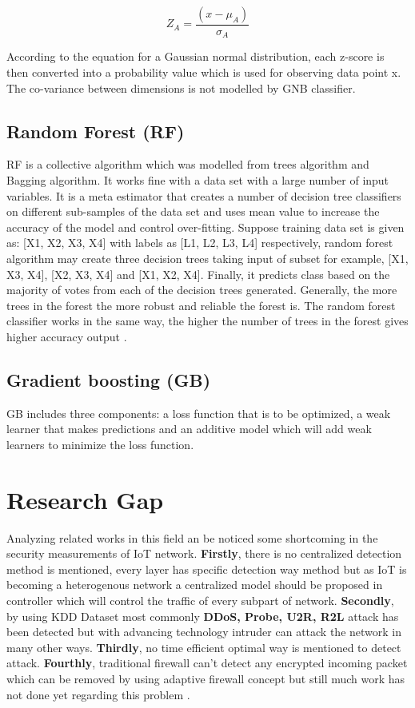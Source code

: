 \begin{equation*}
    Z_A=\frac{(x-\mu_A)}{\sigma_A}
\end{equation*}

According to the equation for a Gaussian normal distribution, each z-score is then converted into a probability value which is used for observing data point x. The co-variance between dimensions is not modelled by GNB classifier.


\subsection{Random Forest (RF)}
RF is a collective algorithm which was modelled from trees algorithm and Bagging algorithm. It works fine with a data set with a large number of input variables. It is a meta estimator that creates a number of decision tree classifiers on different sub-samples of the data set and uses mean value to increase the accuracy of the model and control over-fitting. Suppose training data set is given as: [X1, X2, X3, X4] with labels as [L1, L2, L3, L4] respectively, random forest algorithm may create three decision trees taking input of subset for example, [X1, X3, X4], [X2, X3, X4] and [X1, X2, X4]. Finally, it predicts class based on the majority of votes from each of the decision trees generated. Generally, the more trees in the forest the more robust and reliable the forest is. The random forest classifier works in the same way, the higher the number of trees in the forest gives higher accuracy output .


\subsection{Gradient boosting (GB)}
GB includes three components: a loss function that is to be optimized, a weak learner that makes predictions and an additive model which will add weak learners to minimize the loss function. 









\section{Research Gap}
Analyzing related works in this field an be noticed some shortcoming in the security measurements of IoT network. \textbf{Firstly}, there is no centralized detection method is mentioned, every layer has specific detection way method but as IoT is becoming a heterogenous network a centralized model should be proposed in controller which will control the traffic of every subpart of network. \textbf{Secondly}, by using KDD Dataset most commonly \textbf{DDoS, Probe, U2R, R2L} attack has been detected but with advancing technology intruder can attack the network in many other ways. \textbf{Thirdly}, no time efficient optimal way is mentioned to detect attack. \textbf{Fourthly}, traditional firewall can’t detect any encrypted incoming packet which can be removed by using adaptive firewall concept but still much work has not done yet regarding this problem \cite{mahmud_brain-inspired_2018,8742551,noauthor_coronavirus_nodate}.

